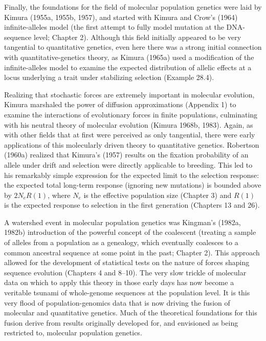 \documentclass{article}
\begin{document}
Finally, the foundations for the field of molecular population genetics were laid by Kimura (1955a, 1955b, 1957), and started with Kimura and Crow's (1964) infinite-alleles model (the first attempt to fully model mutation at the DNA-sequence level; Chapter 2). Although this field initially appeared to be very tangential to quantitative genetics, even here there was a strong initial connection with quantitative-genetics theory, as Kimura (1965a) used a modification of the infinite-alleles model to examine the expected distribution of allelic effects at a locus underlying a trait under stabilizing selection (Example 28.4).

Realizing that stochastic forces are extremely important in molecular evolution, Kimura marshaled the power of diffusion approximations (Appendix 1) to examine the interactions of evolutionary forces in finite populations, culminating with his neutral theory of molecular evolution (Kimura 1968b, 1983). Again, as with other fields that at first were perceived as only tangential, there were early applications of this molecularly driven theory to quantitative genetics. Robertson (1960a) realized that Kimura's (1957) results on the fixation probability of an allele under drift and selection were directly applicable to breeding. This led to his remarkably simple expression for the expected limit to the selection response: the expected total long-term response (ignoring new mutations) is bounded above by  $ 2N_{e}R(1) $, where  $ N_{e} $ is the effective population size (Chapter 3) and  $ R(1) $ is the expected response to selection in the first generation (Chapters 13 and 26).

A watershed event in molecular population genetics was Kingman's (1982a, 1982b) introduction of the powerful concept of the coalescent (treating a sample of alleles from a population as a genealogy, which eventually coalesces to a common ancestral sequence at some point in the past; Chapter 2). This approach allowed for the development of statistical tests on the nature of forces shaping sequence evolution (Chapters 4 and 8–10). The very slow trickle of molecular data on which to apply this theory in those early days has now become a veritable tsunami of whole-genome sequences at the population level. It is this very flood of population-genomics data that is now driving the fusion of molecular and quantitative genetics. Much of the theoretical foundations for this fusion derive from results originally developed for, and envisioned as being restricted to, molecular population genetics.
\end{document}
